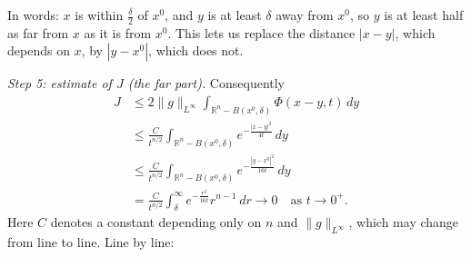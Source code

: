 \documentclass[11pt]{article}
\theoremstyle{plain}
\theoremstyle{definition}
\theoremstyle{remark}
\begin{document}
In words: $x$ is within $\frac\delta2$ of $x^0$, and $y$ is at least $\delta$ away from $x^0$, so $y$ is at least half as far from $x$ as it is from $x^0$. This lets us replace the distance $|x - y|$, which depends on $x$, by $|y - x^0|$, which does not.

\emph{Step 5: estimate of $J$ (the far part).} Consequently
\begin{align*}
J &\leq 2\|g\|_{L^\infty}\int_{\mathbb{R}^n - B(x^0,\delta)}\Phi(x - y,t)\, dy \\
&\leq \frac{C}{t^{n/2}}\int_{\mathbb{R}^n - B(x^0,\delta)} e^{-\frac{|x-y|^2}{4t}}\, dy \\
&\leq \frac{C}{t^{n/2}}\int_{\mathbb{R}^n - B(x^0,\delta)} e^{-\frac{|y-x^0|^2}{16t}}\, dy \\
&= \frac{C}{t^{n/2}}\int_\delta^\infty e^{-\frac{r^2}{16t}}r^{n-1}\, dr \to 0 \quad \text{as } t \to 0^+.
\end{align*}
Here $C$ denotes a constant depending only on $n$ and $\|g\|_{L^\infty}$, which may change from line to line. Line by line:
\end{document}
